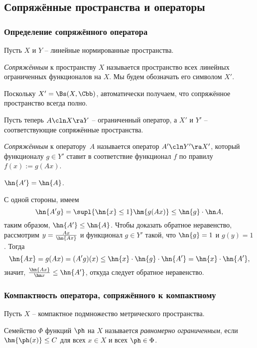 \documentclass[a4paper]{article}
\begin{document}
\subsection{Сопряжённые пространства и операторы}

\subsubsection{Определение сопряжённого оператора}

Пусть $X$ и $Y$ -- линейные нормированные пространства.

\begin{df}
\emph{Сопряжённым} к пространству $X$ называется пространство всех
линейных ограниченных функционалов на $X$. Мы будем обозначать его символом $X'$.
\end{df}

Поскольку $X' = \Bs(X, \Cbb)$, автоматически получаем, что сопряжённое пространство всегда
полно.

Пусть теперь $A\cln X \ra Y$ -- ограниченный оператор, а $X'$ и $Y'$ -- соответствующие сопряжённые пространства.

\begin{df}
\emph{Сопряжённым} к оператору~$A$ называется оператор $A'\cln Y' \ra X'$, который функционалу
$g \in Y'$ ставит в соответствие функционал $f$ по правилу $f(x) := g(Ax)$.
\end{df}

\begin{stm}
$\hn{A'} = \hn{A}$.
\end{stm}
С одной стороны, имеем
$$\hn{A'g} = \supl{\hn{x} \le 1} \hm{g(Ax)} \le \hn{g}\cdot \hn A,$$
таким образом, $\hn{A'} \le \hn{A}$. Чтобы доказать обратное неравенство,
рассмотрим $y = \frac{Ax}{\hn{Ax}}$ и функционал $g \in Y'$ такой, что
$\hn{g} = 1$ и $g(y) = 1$. Тогда
$$\hn{Ax} = g(Ax) = (A'g)(x)  \le \hn{x} \cdot \hn{g} \cdot \hn{A'} = \hn{x} \cdot \hn{A'},$$
значит, $\frac{\hn{Ax}}{\hn x} \le \hn{A'}$,
откуда следует обратное неравенство.

\subsubsection{Компактность оператора, сопряжённого к компактному}

Пусть $X$ -- компактное подмножество метрического пространства.

\begin{df}
Семейство $\Phi$ функций $\ph$ на $X$ называется \emph{равномерно ограниченным},
если $\hm{\ph(x)} \le C$ для всех $x \in X$ и всех $\ph \in \Phi$.
\end{df}
\end{document}
